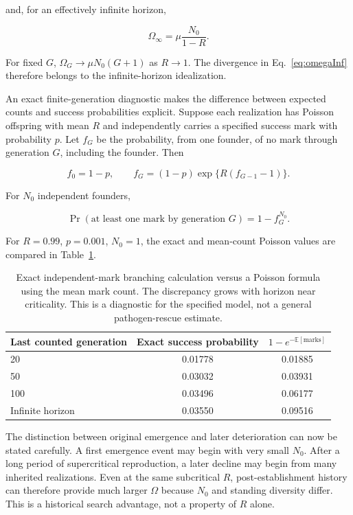 \documentclass[11pt,a4paper]{article}
\begin{document}
and, for an effectively infinite horizon,

\begin{equation}
\Omega_\infty
=
\mu\frac{N_0}{1-R}.
\label{eq:omegaInf}
\end{equation}

For fixed $G$, $\Omega_G\to\mu N_0(G+1)$ as $R\to1$. The divergence in Eq.~\eqref{eq:omegaInf} therefore belongs to the infinite-horizon idealization.

An exact finite-generation diagnostic makes the difference between expected counts and success probabilities explicit. Suppose each realization has Poisson offspring with mean $R$ and independently carries a specified success mark with probability $p$. Let $f_G$ be the probability, from one founder, of no mark through generation $G$, including the founder. Then

\begin{equation}
f_0=1-p,
\qquad
f_G=(1-p)\exp\{R(f_{G-1}-1)\}.
\label{eq:finite-mark-recursion}
\end{equation}

For $N_0$ independent founders,

\begin{equation}
\Pr(\text{at least one mark by generation }G)
=1-f_G^{N_0}.
\label{eq:finite-mark-prob}
\end{equation}

For $R=0.99$, $p=0.001$, $N_0=1$, the exact and mean-count Poisson values are compared in Table~\ref{tab:branching-marks}.

\begin{table}[htbp]
\centering
\begin{tabular}{lcc}
\toprule
Last counted generation & Exact success probability & $1-e^{-\mathbb E[\text{marks}]}$ \\
\midrule
20 & 0.01778 & 0.01885 \\
50 & 0.03032 & 0.03931 \\
100 & 0.03496 & 0.06177 \\
Infinite horizon & 0.03550 & 0.09516 \\
\bottomrule
\end{tabular}
\caption{Exact independent-mark branching calculation versus a Poisson formula using the mean mark count. The discrepancy grows with horizon near criticality. This is a diagnostic for the specified model, not a general pathogen-rescue estimate.}
\label{tab:branching-marks}
\end{table}

The distinction between original emergence and later deterioration can now be stated carefully. A first emergence event may begin with very small $N_0$. After a long period of supercritical reproduction, a later decline may begin from many inherited realizations. Even at the same subcritical $R$, post-establishment history can therefore provide much larger $\Omega$ because $N_0$ and standing diversity differ. This is a historical search advantage, not a property of $R$ alone.
\end{document}
